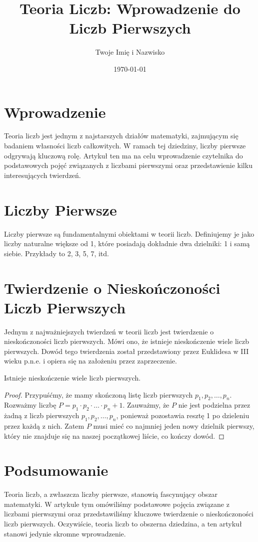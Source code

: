\documentclass[12pt]{article}
\title{Teoria Liczb: Wprowadzenie do Liczb Pierwszych}
\author{Twoje Imię i Nazwisko}
\date{\today}
\begin{document}
\maketitle

\section{Wprowadzenie}
Teoria liczb jest jednym z najstarszych działów matematyki, zajmującym się badaniem własności liczb całkowitych. W ramach tej dziedziny, liczby pierwsze odgrywają kluczową rolę. Artykuł ten ma na celu wprowadzenie czytelnika do podstawowych pojęć związanych z liczbami pierwszymi oraz przedstawienie kilku interesujących twierdzeń.

\section{Liczby Pierwsze}
Liczby pierwsze są fundamentalnymi obiektami w teorii liczb. Definiujemy je jako liczby naturalne większe od 1, które posiadają dokładnie dwa dzielniki: 1 i samą siebie. Przykłady to 2, 3, 5, 7, itd.

\section{Twierdzenie o Nieskończoności Liczb Pierwszych}
Jednym z najważniejszych twierdzeń w teorii liczb jest twierdzenie o nieskończoności liczb pierwszych. Mówi ono, że istnieje nieskończenie wiele liczb pierwszych. Dowód tego twierdzenia został przedstawiony przez Euklidesa w III wieku p.n.e. i opiera się na założeniu przez zaprzeczenie.

\begin{theorem}
Istnieje nieskończenie wiele liczb pierwszych.
\end{theorem}

\begin{proof}
Przypuśćmy, że mamy skończoną listę liczb pierwszych $p_1, p_2, \ldots, p_n$. Rozważmy liczbę $P = p_1 \cdot p_2 \cdot \ldots \cdot p_n + 1$. Zauważmy, że $P$ nie jest podzielna przez żadną z liczb pierwszych $p_1, p_2, \ldots, p_n$, ponieważ pozostawia resztę 1 po dzieleniu przez każdą z nich. Zatem $P$ musi mieć co najmniej jeden nowy dzielnik pierwszy, który nie znajduje się na naszej początkowej liście, co kończy dowód.
\end{proof}

\section{Podsumowanie}
Teoria liczb, a zwłaszcza liczby pierwsze, stanowią fascynujący obszar matematyki. W artykule tym omówiliśmy podstawowe pojęcia związane z liczbami pierwszymi oraz przedstawiliśmy kluczowe twierdzenie o nieskończoności liczb pierwszych. Oczywiście, teoria liczb to obszerna dziedzina, a ten artykuł stanowi jedynie skromne wprowadzenie.
\end{document}
